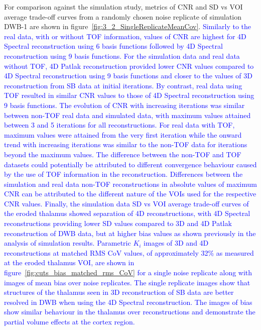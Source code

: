 For comparison against the simulation study, metrics of CNR and SD vs VOI average trade-off curves from a randomly chosen noise replicate of simulation DWB-1 are shown in figure~\ref{fig:3_2_SingleReplicateMeanCov}.
\textcolor{blue}{Similarly to the real data, with or without TOF information, values of CNR are highest for 4D Spectral reconstruction using 6 basis functions followed by 4D Spectral reconstruction using 9 basis functions.
For the simulation data and real data without TOF, 4D Patlak reconstruction provided lower CNR values compared to 4D Spectral reconstruction using 9 basis functions and closer to the values of 3D reconstruction from SB data at initial iterations. By contrast, real data using TOF resulted in similar CNR values to those of 4D Spectral reconstruction using 9 basis functions.
The evolution of CNR with increasing iterations was similar between non-TOF real data and simulated data, with maximum values attained between 3 and 5 iterations for all reconstructions.
For real data with TOF, maximum values were attained from the very first iteration while the onward trend with increasing iterations was similar to the non-TOF data for iterations beyond the maximum values.
The difference between the non-TOF and TOF datasets could potentially be attributed to different convergence behaviour caused by the use of TOF information in the reconstruction. Differences between the simulation and real data non-TOF reconstructions in absolute values of maximum CNR can be attributed to the different nature of the VOIs used for the respective CNR values.
Finally, the simulation data SD vs VOI average trade-off curves of the eroded thalamus showed separation of 4D reconstructions, with 4D Spectral reconstructions providing lower SD values compared to 3D and 4D Patlak reconstruction of DWB data, but at higher bias values as shown previously in the analysis of simulation results.
Parametric $K_i$ images of 3D and 4D reconstructions at matched RMS CoV values, of approximately 32\% as measured at the eroded thalamus VOI, are shown in figure~\ref{fig:cuts_bias_matched_rms_CoV} for a single noise replicate along with images of mean bias over noise replicates. The single replicate images show that structures of the thalamus seen in 3D reconstruction of SB data are better resolved in DWB when using the 4D Spectral reconstruction. The images of bias show similar behaviour in the thalamus over reconstructions and demonstrate the partial volume effects at the cortex region.}

